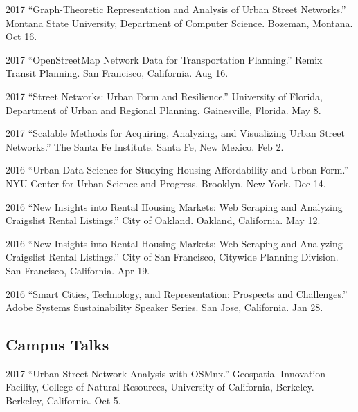 \documentclass[12pt,letterpaper]{report}
\begin{document}
\begin{tablist}
\item[2017] \tab \enquote{Graph-Theoretic Representation and Analysis of Urban Street Networks.} Montana State University, Department of Computer Science. Bozeman, Montana. Oct 16.

\item[2017] \tab \enquote{OpenStreetMap Network Data for Transportation Planning.} Remix Transit Planning. San Francisco, California. Aug 16.

\item[2017] \tab \enquote{Street Networks: Urban Form and Resilience.} University of Florida, Department of Urban and Regional Planning. Gainesville, Florida. May 8.

\item[2017] \tab \enquote{Scalable Methods for Acquiring, Analyzing, and Visualizing Urban Street Networks.} The Santa Fe Institute. Santa Fe, New Mexico. Feb 2.

\item[2016] \tab \enquote{Urban Data Science for Studying Housing Affordability and Urban Form.} NYU Center for Urban Science and Progress. Brooklyn, New York. Dec 14.

\item[2016] \tab \enquote{New Insights into Rental Housing Markets: Web Scraping and Analyzing Craigslist Rental Listings.} City of Oakland. Oakland, California. May 12.

\item[2016] \tab \enquote{New Insights into Rental Housing Markets: Web Scraping and Analyzing Craigslist Rental Listings.} City of San Francisco, Citywide Planning Division. San Francisco, California. Apr 19.

\item[2016] \tab \enquote{Smart Cities, Technology, and Representation: Prospects and Challenges.} Adobe Systems Sustainability Speaker Series. San Jose, California. Jan 28.

\end{tablist}

\subsection*{Campus Talks}

\begin{tablist}
	
\item[2017] \tab \enquote{Urban Street Network Analysis with OSMnx.} Geospatial Innovation Facility, College of Natural Resources, University of California, Berkeley. Berkeley, California. Oct 5.

\end{tablist}
\end{document}
